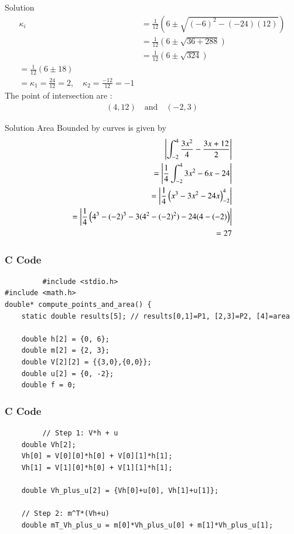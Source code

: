 \documentclass{beamer}
\begin{document}
 \begin{frame}{Solution}
     \begin{align}
         \kappa_i &= \frac{1}{12} \left(6 \pm \sqrt{(-6)^2 - (-24)(12)}\right) \\
&= \frac{1}{12} \left(6 \pm \sqrt{36 + 288}\right) \\
&= \frac{1}{12} \left(6 \pm \sqrt{324}\right)\\ 
=\frac{1}{12} (6 \pm 18)\\
= \kappa_1 = \frac{24}{12} = 2, \quad 
\kappa_2 = \frac{-12}{12} = -1
\end{align}
The point of intersection are :
\begin{align}
    (4, 12) \quad \text{and} \quad (-2, 3)
\end{align}
 \end{frame}
 \begin{frame}{Solution}
     Area Bounded by curves is given by \\
\begin{align}
   \left | \int_{-2}^{4} \frac{3x^2}{4}-\frac{3x+12}{2} \right |\\
   = \left |\frac{1}{4}\int_{-2}^{4} 3 x^2 -6x -24  \right |\\
   = \left |\frac{1}{4}\left( x^3 -3 x^2 -24 x \right)_{-2}^{4} \right |\\
   =\left | \frac{1}{4}\left(4^3 - (-2)^3 -3(4^2 - (-2)^2) -24(4-(-2)\right) \right |\\
           =27 
\end{align}
 \end{frame}
 \begin{frame}[fragile]
     \frametitle{C Code}
     \begin{lstlisting}
         #include <stdio.h>
#include <math.h>
double* compute_points_and_area() {
    static double results[5]; // results[0,1]=P1, [2,3]=P2, [4]=area

    double h[2] = {0, 6};
    double m[2] = {2, 3};
    double V[2][2] = {{3,0},{0,0}};
    double u[2] = {0, -2};
    double f = 0;
     \end{lstlisting}
 \end{frame}
  \begin{frame}[fragile]
     \frametitle{C Code}
     \begin{lstlisting}
         // Step 1: V*h + u
    double Vh[2];
    Vh[0] = V[0][0]*h[0] + V[0][1]*h[1];
    Vh[1] = V[1][0]*h[0] + V[1][1]*h[1];

    double Vh_plus_u[2] = {Vh[0]+u[0], Vh[1]+u[1]};

    // Step 2: m^T*(Vh+u)
    double mT_Vh_plus_u = m[0]*Vh_plus_u[0] + m[1]*Vh_plus_u[1];

     \end{lstlisting}
 \end{frame}
\end{document}
